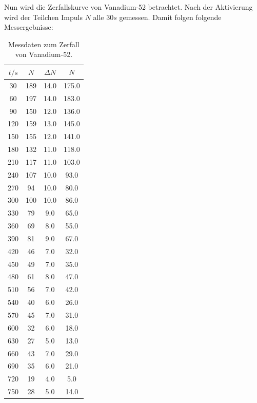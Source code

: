     Nun wird die Zerfallskurve von Vanadium-52 betrachtet. Nach der Aktivierung wird der Teilchen Impuls $N$ alle $30 s$ gemessen. Damit folgen folgende Messergebnisse:
\begin{table}
	\centering
	\caption{Messdaten zum Zerfall von Vanadium-52.} 
	\label{tab:vana} 
	\begin{tabular}{c c c c}
	\toprule
	$t / \si{\second}$ & $N$ & $\Delta N$ &$N$ \\
	\midrule
		30   	&      189  	& 14.0 &      175.0 \\
		  60   	&      197  	& 14.0 &      183.0 \\
		  90   	&      150  	& 12.0 &      136.0 \\
		 120   	&      159  	& 13.0 &      145.0 \\
		 150   	&      155  	& 12.0 &      141.0 \\
		 180   	&      132  	& 11.0 &      118.0 \\
		 210   	&      117  	& 11.0 &      103.0 \\
		 240   	&      107  	& 10.0 &       93.0 \\
		 270   	&       94  	& 10.0 &       80.0 \\
		 300   	&      100  	& 10.0 &       86.0 \\
		 330   	&       79  	&  9.0 &       65.0 \\
		 360   	&       69  	&  8.0 &       55.0 \\
		 390   	&       81  	&  9.0 &       67.0 \\
		 420   	&       46  	&  7.0 &       32.0 \\
		 450   	&       49  	&  7.0 &       35.0 \\
		 480   	&       61  	&  8.0 &       47.0 \\
		 510   	&       56  	&  7.0 &       42.0 \\
		 540   	&       40  	&  6.0 &       26.0 \\
		 570   	&       45  	&  7.0 &       31.0 \\
		 600   	&       32  	&  6.0 &       18.0 \\
		 630   	&       27  	&  5.0 &       13.0 \\
		 660   	&       43  	&  7.0 &       29.0 \\
		 690   	&       35  	&  6.0 &       21.0 \\
		 720   	&       19  	&  4.0 &        5.0 \\
		 750   	&       28  	&  5.0 &       14.0 \\

\end{tabular}
\end{table}
